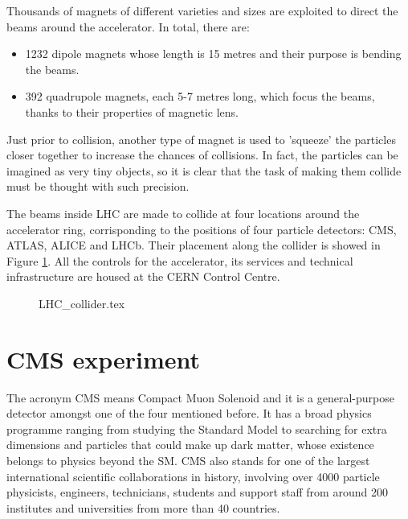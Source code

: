 Thousands of magnets of different varieties and sizes are exploited to direct the beams around the accelerator. In total, there are\footnotemark:
\begin{itemize}
	\item 1232 dipole magnets whose length is 15 metres and their purpose is bending the beams.
	\item 392 quadrupole magnets, each 5-7 metres long, which focus the beams, thanks to their properties of magnetic lens.
\end{itemize}
Just prior to collision, another type of magnet is used to 'squeeze' the particles closer together to increase the chances of collisions. In fact, the particles can be imagined as very tiny objects, so it is clear that the task of making them collide must be thought with such precision.

The beams inside LHC are made to collide at four locations around the accelerator ring, corrisponding to the positions of four particle detectors: CMS, ATLAS, ALICE and LHCb. Their placement along the collider is showed in Figure \ref{fig:LHC_COLLIDER}. All the controls for the accelerator, its services and technical infrastructure are housed at the CERN Control Centre.

\begin{figure}[t]
	\centering
	{LHC_collider.tex}
	\label{fig:LHC_COLLIDER}
\end{figure}





\section{CMS experiment}
The acronym CMS means Compact Muon Solenoid and it is a general-purpose detector amongst one of the four mentioned before. It has a broad physics programme ranging from studying the Standard Model to searching for extra dimensions and particles that could make up dark matter, whose existence belongs to physics beyond the SM. CMS also stands for one of the largest international scientific collaborations in history, involving over 4000 particle physicists, engineers, technicians, students and support staff from around 200 institutes and universities from more than 40 countries.

